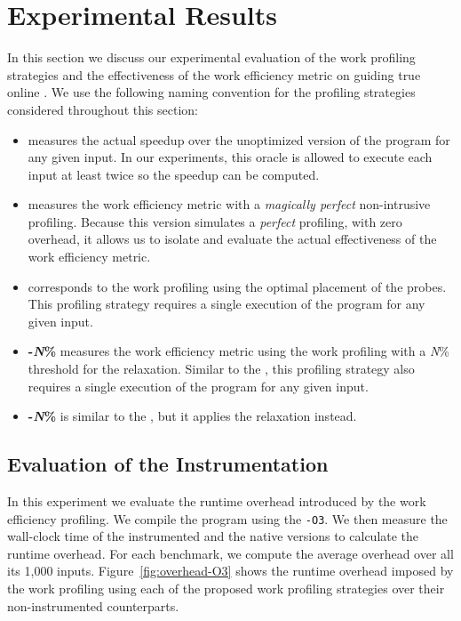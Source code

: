 \section{Experimental Results}\label{sec:results}


In this section we discuss our experimental evaluation of the work profiling strategies and
the effectiveness of the work efficiency metric on guiding true online {\itercomp}.
We use the following naming convention for the profiling strategies considered
throughout this section:
\begin{itemize}[leftmargin=3mm]
\item \textbf{\OracleRM} measures the actual speedup over the unoptimized version of the program for any given input.
In our experiments, this oracle is allowed to execute each input at least twice so the speedup can be computed.
\item \textbf{\OraclePP} measures the work efficiency metric with a \textit{magically perfect} non-intrusive profiling.
  Because this version simulates a \textit{perfect} profiling, with zero overhead,
  it allows us to isolate and evaluate the actual effectiveness of the work efficiency metric.
\item \textbf{\OptProf} corresponds to the work profiling using the optimal placement of the probes.
  This profiling strategy requires a single execution of the program for any given input.
\item \textbf{\WCRelax-\textit{N}\%} measures the work efficiency metric using the work profiling with a \textit{N}\% threshold for
the \WCRelaxLower relaxation.
  Similar to the \OptProf, this profiling strategy also requires a single execution of the program for any given input.
\item \textbf{\WPRelax-\textit{N}\%} is similar to the \WCRelax, but it applies the \WPRelaxLower relaxation instead.
\end{itemize}

\subsection{Evaluation of the Instrumentation}

In this experiment we evaluate the runtime overhead introduced by the work efficiency profiling. We compile the program using the
\texttt{-O3}. We then measure the wall-clock time of the instrumented and the native versions to calculate the runtime overhead. For
each benchmark, we compute the average overhead over all its 1,000 inputs.
Figure~\ref{fig:overhead-O3} shows the runtime overhead imposed by the work profiling using each of the proposed work profiling strategies over
their non-instrumented counterparts.

